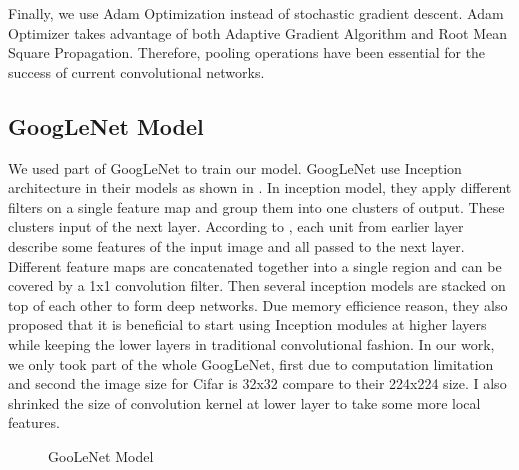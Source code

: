 \documentclass{article} %
\begin{document}
 Finally, we use Adam Optimization instead of stochastic gradient descent. Adam Optimizer takes advantage
 of both Adaptive Gradient Algorithm and Root Mean Square Propagation. 
 Therefore, pooling operations have been essential for the success of current convolutional networks.


 \subsection{GoogLeNet Model }
We used part of GoogLeNet to train our model. GoogLeNet use Inception architecture in their models as shown in . In inception model, they apply different filters on a single feature map and group them into one clusters of output. These clusters input of the next layer. According to \cite{Googlenet}, each unit from earlier layer describe some features of the input image and all passed to the next layer. Different feature maps are concatenated together into a single region and can be covered by a 1x1 convolution filter. Then several inception models are stacked on top of each other to form deep networks. Due memory efficience reason, they also proposed that it is beneficial to start using Inception modules at higher layers while keeping the lower layers in traditional convolutional fashion. In our work, we only took part of the whole GoogLeNet, first due to computation limitation and second the image size for Cifar is 32x32 compare to their 224x224 size. I also shrinked the size of convolution kernel at lower layer to take some more local features.
 \begin{figure}[h]
    \centering
    \qquad
    \caption{GooLeNet Model}
    \label{fig:goog}
\end{figure}
\end{document}
